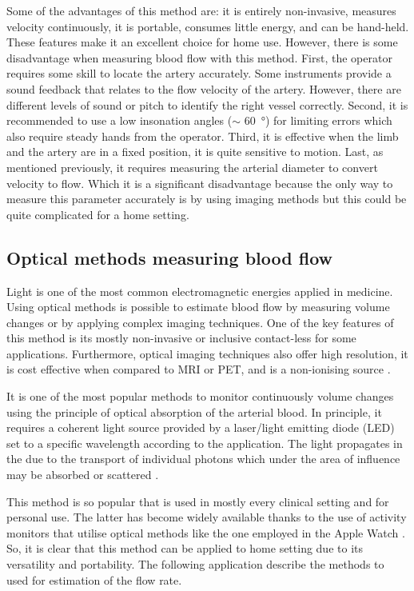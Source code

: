 Some of the advantages of this method are: it is entirely non-invasive, measures velocity continuously, it is portable, consumes little energy, and can be hand-held. These features make it an excellent choice for home use. However, there is some disadvantage when measuring blood flow with this method. First, the operator requires some skill to locate the artery accurately. Some instruments provide a sound feedback that relates to the flow velocity of the artery. However, there are different levels of sound or pitch to identify the right vessel correctly. Second, it is recommended to use a low insonation angles ($\sim$ \SI{60}{\degree}) for limiting errors \cite{raadegran1999limb} which also require steady hands from the operator. Third, it is effective when the limb and the artery are in a fixed position, it is quite sensitive to motion. Last, as mentioned previously, it requires measuring the arterial diameter to convert velocity to flow. Which it is a significant disadvantage because the only way to measure this parameter accurately is by using imaging methods \cite{chapter4bloodflow} but this could be quite complicated for a home setting.

\subsection{Optical methods measuring blood flow}
\label{section literature Optic}
Light is one of the most common electromagnetic energies applied in medicine. Using optical methods is possible to estimate blood flow by measuring volume changes or by applying complex imaging techniques. One of the key features of this method is its mostly non-invasive or inclusive contact-less for some applications. Furthermore, optical imaging techniques also offer high resolution, it is cost effective when compared to MRI or PET, and is a non-ionising source \cite{jayanthy2011measuring}.

It is one of the most popular methods to monitor continuously volume changes using the principle of optical absorption of the arterial blood. In principle, it requires a coherent light source provided by a laser/light emitting diode (LED) set to a specific wavelength according to the application. The light propagates in the  due to the transport of individual photons which under the area of influence may be absorbed or scattered \cite{schmitt2003quantitative}. 

This method is so popular that is used in mostly every clinical setting and  for personal use. The latter has become widely available thanks to the use of activity monitors that utilise optical methods like the one employed in the Apple Watch \cite{culbert2017user}. So, it is clear that this method can be applied to home setting due to its versatility and portability. The following application describe the methods to used for estimation of the flow rate. 

